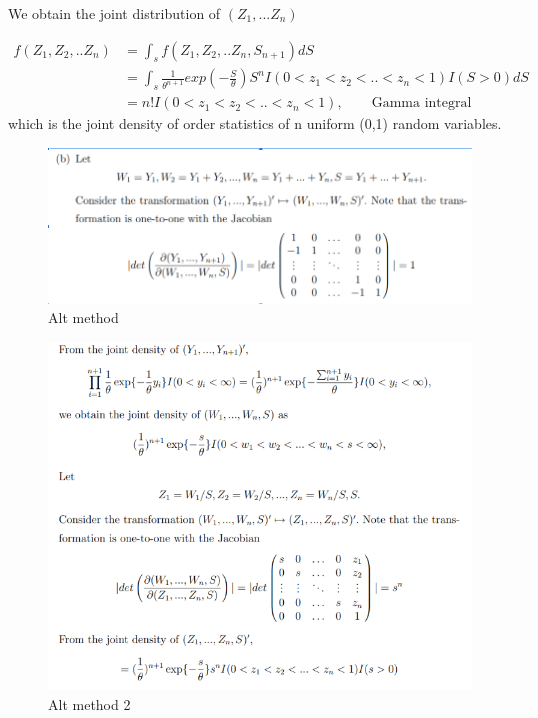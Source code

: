 \documentclass[11pt]{article} %
\begin{document}
We obtain the joint distribution of $(Z_1, ... Z_n)$

\begin{align*}
	f(Z_1, Z_2,.. Z_{n}) &= \int_{s} f(Z_1, Z_2,.. Z_{n}, S_{n+1}) dS \\
	&= \int_{s} \frac{1}{\theta^{n+1}} exp(-\frac{S}{\theta}) S^{n} I(0< z_1 < z_2 <.. <z_n < 1) I(S > 0) dS\\
	&= n! I(0< z_1 < z_2 <.. <z_n < 1), \qquad \text{Gamma integral}
\end{align*}
which is the joint density of order statistics of n uniform (0,1) random variables.

\begin{figure}
	\includegraphics[width=15cm]{Figure/dist1.PNG}  
	\caption{Alt method}
\end{figure}
\begin{figure}
	\includegraphics[width=20cm]{Figure/dist2.PNG}  
	\caption{Alt method 2}
\end{figure}
\end{document}
